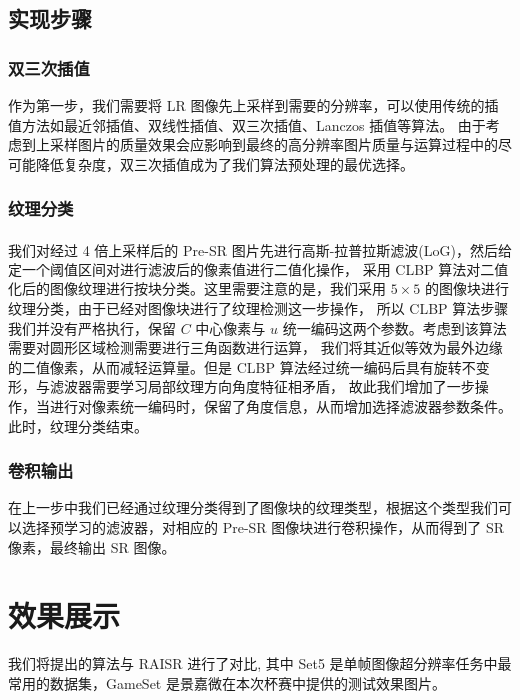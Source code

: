 \documentclass[12pt, a4paper, oneside]{ctexbook}
\begin{document}
	\section{实现步骤}
	\subsection{双三次插值}
	作为第一步，我们需要将 LR 图像先上采样到需要的分辨率，可以使用传统的插值方法如最近邻插值、双线性插值、双三次插值、Lanczos 插值等算法。
	由于考虑到上采样图片的质量效果会应影响到最终的高分辨率图片质量与运算过程中的尽可能降低复杂度，双三次插值成为了我们算法预处理的最优选择。
	\subsection{纹理分类}
	我们对经过 4 倍上采样后的 Pre-SR 图片先进行高斯-拉普拉斯滤波(LoG)\textsuperscript{\cite{12}}，然后给定一个阈值区间对进行滤波后的像素值进行二值化操作，
	采用 CLBP 算法对二值化后的图像纹理进行按块分类。这里需要注意的是，我们采用 $5 \times 5$ 的图像块进行纹理分类，由于已经对图像块进行了纹理检测这一步操作，
	所以 CLBP 算法步骤我们并没有严格执行，保留 $C$ 中心像素与 $u$ 统一编码这两个参数。考虑到该算法需要对圆形区域检测需要进行三角函数进行运算，
	我们将其近似等效为最外边缘的二值像素，从而减轻运算量。但是 CLBP 算法经过统一编码后具有旋转不变形，与滤波器需要学习局部纹理方向角度特征相矛盾，
	故此我们增加了一步操作，当进行对像素统一编码时，保留了角度信息，从而增加选择滤波器参数条件。此时，纹理分类结束。
	\subsection{卷积输出}
	在上一步中我们已经通过纹理分类得到了图像块的纹理类型，根据这个类型我们可以选择预学习的滤波器，对相应的 Pre-SR 图像块进行卷积操作，从而得到了 SR 像素，最终输出 SR 图像。
	
	\chapter{效果展示}
	我们将提出的算法与 RAISR 进行了对比,	其中 Set5 是单帧图像超分辨率任务中最常用的数据集，GameSet 是景嘉微在本次杯赛中提供的测试效果图片。
	
\end{document}
